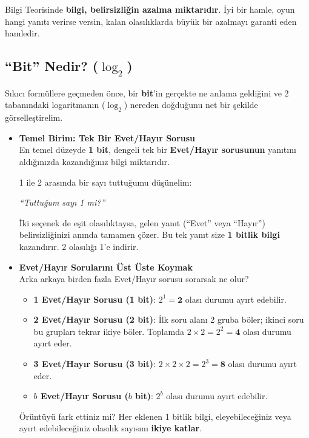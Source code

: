 \documentclass[11pt,a4paper]{article}
\begin{document}
Bilgi Teorisinde \textbf{bilgi, belirsizliğin azalma miktarıdır}. İyi bir hamle, oyun hangi yanıtı verirse versin, kalan olasılıklarda büyük bir azalmayı garanti eden hamledir.

\subsection{\texorpdfstring{``Bit'' Nedir? ($\log_2$)}{Bit Nedir?}}
Sıkıcı formüllere geçmeden önce, bir \textbf{bit}'in gerçekte ne anlama geldiğini ve 2 tabanındaki logaritmanın ($\log_2$) nereden doğduğunu net bir şekilde görselleştirelim.

\begin{itemize}[leftmargin=1.5em, itemsep=12pt]
    \item \textbf{Temel Birim: Tek Bir Evet/Hayır Sorusu} \\
    En temel düzeyde \textbf{1 bit}, dengeli tek bir \textbf{Evet/Hayır sorusunun} yanıtını aldığınızda kazandığınız bilgi miktarıdır.
    
    1 ile 2 arasında bir sayı tuttuğumu düşünelim:
    \begin{center}
    \textit{``Tuttuğum sayı 1 mi?''}
    \end{center}
    İki seçenek de eşit olasılıktaysa, gelen yanıt (``Evet'' veya ``Hayır'') belirsizliğinizi anında tamamen çözer. Bu tek yanıt size \textbf{1 bitlik bilgi} kazandırır. 2 olasılığı 1'e indirir.

    \item \textbf{Evet/Hayır Sorularını Üst Üste Koymak} \\
    Arka arkaya birden fazla Evet/Hayır sorusu sorarsak ne olur?
    \begin{itemize}[itemsep=3pt]
        \item \textbf{1 Evet/Hayır Sorusu (1 bit)}: $2^1 = \textbf{2}$ olası durumu ayırt edebilir.
        \item \textbf{2 Evet/Hayır Sorusu (2 bit)}: İlk soru alanı 2 gruba böler; ikinci soru bu grupları tekrar ikiye böler. Toplamda $2 \times 2 = 2^2 = \textbf{4}$ olası durumu ayırt eder.
        \item \textbf{3 Evet/Hayır Sorusu (3 bit)}: $2 \times 2 \times 2 = 2^3 = \textbf{8}$ olası durumu ayırt eder.
        \item \textbf{$b$ Evet/Hayır Sorusu ($b$ bit)}: $2^b$ olası durumu ayırt edebilir.
    \end{itemize}
    Örüntüyü fark ettiniz mi? Her eklenen 1 bitlik bilgi, eleyebileceğiniz veya ayırt edebileceğiniz olasılık sayısını \textbf{ikiye katlar}.


\end{itemize}
\end{document}
